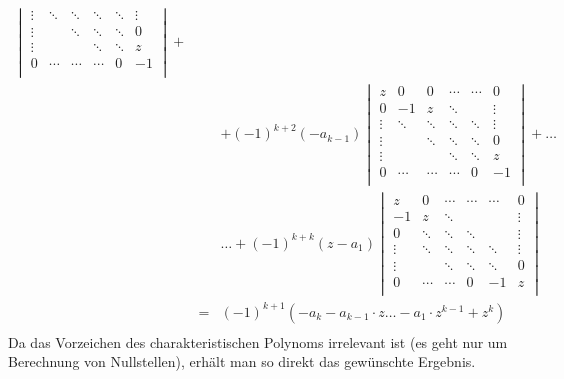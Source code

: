 \begin{enumerate}[(a)]
\begin{eqnarray*}
\begin{vmatrix}
                                        \vdots & \ddots & \ddots & \ddots & \ddots & \vdots \\
                                        \vdots &        & \ddots & \ddots & \ddots & 0      \\
                                        \vdots &        &        & \ddots & \ddots & z      \\
                                        0      & \cdots & \cdots & \cdots & 0      & -1     \\
				\end{vmatrix} + \\
	& & + (-1)^{k+2}(-a_{k-1})
				\begin{vmatrix}
					z      & 0      & 0      & \cdots & \cdots & 0      \\
                                        0      & -1     & z      & \ddots &        & \vdots \\
                                        \vdots & \ddots & \ddots & \ddots & \ddots & \vdots \\
                                        \vdots &        & \ddots & \ddots & \ddots & 0      \\
                                        \vdots &        &        & \ddots & \ddots & z      \\
                                        0      & \cdots & \cdots & \cdots & 0      & -1     \\

				\end{vmatrix} + \ldots \\
	& & \ldots + (-1)^{k+k}(z - a_1)	\begin{vmatrix}
					z      & 0      & \cdots & \cdots & \cdots & 0      \\
					-1     & z      & \ddots &        &        & \vdots \\
					0      & \ddots & \ddots & \ddots &        & \vdots \\
					\vdots & \ddots & \ddots & \ddots & \ddots & \vdots \\
					\vdots &        & \ddots & \ddots & \ddots & 0      \\
					0      & \cdots & \cdots & 0      & -1     & z      \\
				\end{vmatrix} \\
	&=& (-1)^{k+1} \left( -a_k - a_{k-1}\cdot z \ldots - a_1 \cdot z^{k-1} + z^k \right) \\
	\end{eqnarray*}
	Da das Vorzeichen des charakteristischen Polynoms irrelevant ist (es geht nur um Berechnung von Nullstellen),
	erhält man so direkt das gewünschte Ergebnis.


\end{enumerate}
